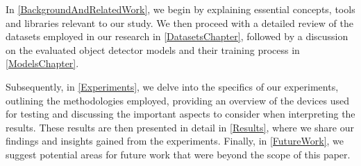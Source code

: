 In \autoref{BackgroundAndRelatedWork}, we begin by explaining essential
concepts, tools and libraries relevant to our study. We then proceed with a
detailed review of the datasets employed in our research in
\autoref{DatasetsChapter}, followed by a discussion on the evaluated object
detector models and their training process in \autoref{ModelsChapter}.

Subsequently, in \autoref{Experiments}, we delve into the specifics of our
experiments, outlining the methodologies employed, providing an overview of the
devices used for testing and discussing the important aspects to consider when
interpreting the results. These results are then presented in detail in
\autoref{Results}, where we share our findings and insights gained from the
experiments. Finally, in \autoref{FutureWork}, we suggest potential areas for
future work that were beyond the scope of this paper.



